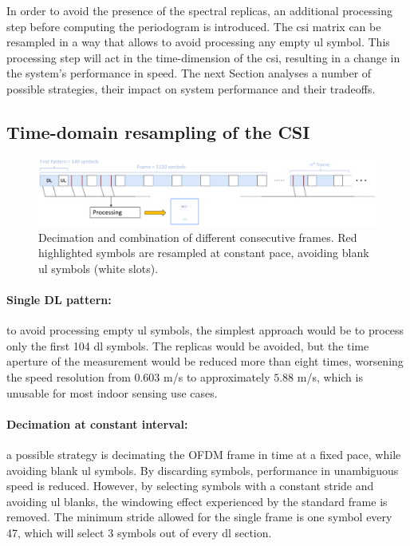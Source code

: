 			In order to avoid the presence of the spectral replicas, an additional processing step before computing the periodogram is introduced.
			The \gls{csi} matrix can be resampled in a way that allows to avoid processing any empty \gls{ul} symbol.
			This processing step will act in the time-dimension of the \gls{csi}, resulting in a change in the system's performance in speed.
			The next Section analyses a number of possible strategies, their impact on system performance and their tradeoffs.    

	\subsection{Time-domain resampling of the CSI}

		    \begin{figure}[H]
		        \centering
		        \includegraphics[width=1\textwidth]{Images/TDDprocessing/TDDstrategies.eps}
		        \caption{\small Decimation and combination of different consecutive frames. Red highlighted symbols are resampled at constant pace, avoiding blank \gls{ul} symbols (white slots).}
		        \label{fig:TDDstrategies}
		    \end{figure}
		
		    \paragraph{Single DL pattern:}
		    to avoid processing empty \gls{ul} symbols, the simplest approach would be to process only the first 104 \gls{dl} symbols. The replicas would be avoided, but the time aperture of the measurement would be reduced more than eight times, worsening the speed resolution from $0.603$ m/s to approximately $5.88$ m/s, which is unusable for most indoor sensing use cases.
		    
		    \paragraph{Decimation at constant interval:}
		     a possible strategy is decimating the OFDM frame in time at a fixed pace, while avoiding blank \gls{ul} symbols. 
		     By discarding symbols, performance in unambiguous speed is reduced. However, by selecting symbols with a constant stride and avoiding \gls{ul} blanks, the windowing effect experienced by the standard frame is removed.
		     The minimum stride allowed for the single frame is one symbol every 47, which will select 3 symbols out of every \gls{dl} section.
		     
